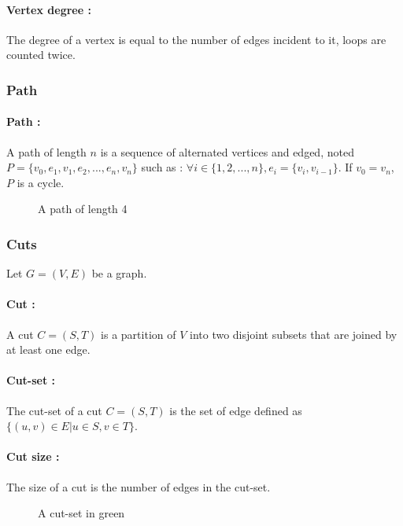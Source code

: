 \paragraph{Vertex degree :}
The degree of a vertex is equal to the number of edges incident to it, loops
are counted twice.

\subsubsection{Path}
\paragraph{Path :}
A path of length $n$ is a sequence of alternated vertices and edged, noted
$P = \{v_0, e_1, v_1, e_2, ..., e_n, v_n\}$ such as :
$\forall i \in \{1,2, ..., n\}, e_i = \{v_i, v_{i-1}\}$. If $v_0 = v_n$, $P$ is
a cycle.

\begin{figure}[!h]
  \begin{center}
    
  \end{center}
  \caption{A path of length 4}
\end{figure}

\subsubsection{Cuts}
Let $G=(V,E)$ be a graph.
\paragraph{Cut :}
A cut $C=(S,T)$ is a partition of $V$ into two disjoint subsets that are joined by at least one edge.

\paragraph{Cut-set :}
The cut-set of a cut $C=(S,T)$ is the set of edge defined as $\{(u,v)\in E | u\in S, v \in T\}$.

\paragraph{Cut size :}
The size of a cut is the number of edges in the cut-set.


\begin{figure}[!h]
  \begin{center}
    
  \end{center}
  \caption{A cut-set in green}
\end{figure}

